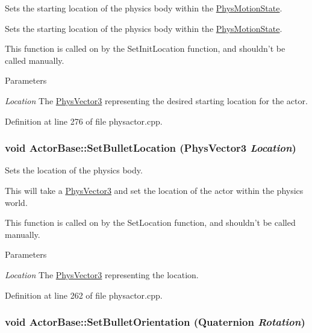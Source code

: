 Sets the starting location of the physics body within the \hyperlink{classPhysMotionState}{PhysMotionState}. 

Sets the starting location of the physics body within the \hyperlink{classPhysMotionState}{PhysMotionState}. \par
 This function is called on by the SetInitLocation function, and shouldn't be called manually. 
\begin{DoxyParams}{Parameters}
\item[{\em Location}]The \hyperlink{classPhysVector3}{PhysVector3} representing the desired starting location for the actor. \end{DoxyParams}


Definition at line 276 of file physactor.cpp.

\hypertarget{classActorBase_af64a57138bbd32c52581a5c8d0d29a76}{
\subsubsection[{SetBulletLocation}]{\setlength{\rightskip}{0pt plus 5cm}void ActorBase::SetBulletLocation ({\bf PhysVector3} {\em Location})}}
\label{dd/d7b/classActorBase_af64a57138bbd32c52581a5c8d0d29a76}


Sets the location of the physics body. 

This will take a \hyperlink{classPhysVector3}{PhysVector3} and set the location of the actor within the physics world. \par
 This function is called on by the SetLocation function, and shouldn't be called manually. 
\begin{DoxyParams}{Parameters}
\item[{\em Location}]The \hyperlink{classPhysVector3}{PhysVector3} representing the location. \end{DoxyParams}


Definition at line 262 of file physactor.cpp.

\hypertarget{classActorBase_a1d9a2b13dcff7a6a2dc83f08f1db97ce}{
\subsubsection[{SetBulletOrientation}]{\setlength{\rightskip}{0pt plus 5cm}void ActorBase::SetBulletOrientation ({\bf Quaternion} {\em Rotation})}}
\label{dd/d7b/classActorBase_a1d9a2b13dcff7a6a2dc83f08f1db97ce}


